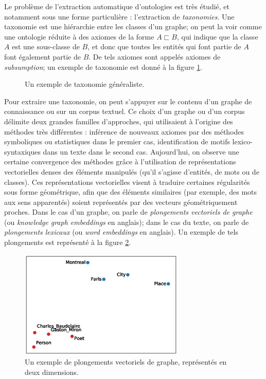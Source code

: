 Le problème de l'extraction automatique d'ontologies est très étudié, et notamment sous une forme particulière : l'extraction de \textit{taxonomies}. Une taxonomie est une hiérarchie entre les classes d'un graphe; on peut la voir comme une ontologie réduite à des axiomes de la forme $A \sqsubset B$, qui indique que la classe $A$ est une sous-classe de $B$, et donc que toutes les entités qui font partie de $A$ font également partie de $B$. De tels axiomes sont appelés axiomes de \textit{subsumption}; un exemple de taxonomie est donné à la figure \ref{fig:intro-taxo}.

\begin{figure}[h]
    \centering
    
    \caption{Un exemple de taxonomie généraliste.}
    \label{fig:intro-taxo}
\end{figure}


Pour extraire une taxonomie, on peut s'appuyer sur le contenu d'un graphe de connaissance ou sur un corpus textuel. Ce choix d'un graphe ou d'un corpus délimite deux grandes familles d'approches, qui utilisaient à l'origine des méthodes très différentes :
inférence de nouveaux axiomes par des méthodes symboliques ou statistiques dans le premier cas,  identification de motifs lexico-syntaxiques dans un texte dans le second cas. Aujourd'hui, 
on observe une certaine convergence des méthodes grâce à l'utilisation de représentations vectorielles denses des éléments manipulés (qu'il s'agisse d'entités, de mots ou de classes). Ces représentations vectorielles visent à traduire certaines régularités sous forme géométrique, afin que des éléments similaires (par exemple, des mots aux sens apparentés) soient représentés par des vecteurs géométriquement proches. Dans le cas d'un graphe, on parle de \textit{plongements vectoriels de graphe} (ou \textit{knowledge graph embeddings} en anglais); dans le cas du texte, on parle de \textit{plongements lexicaux} (ou \textit{word embeddings} en anglais). Un exemple de tels plongements est représenté à la figure \ref{fig:intro-embeddings}.

%

\begin{figure}[h]
    \centering
    \includegraphics[width=0.7\textwidth]{img/embedding_pca_transe2.eps}
    \caption[Exemple de plongements vectoriels]{
    Un exemple de plongements vectoriels de graphe, représentés en deux dimensions\footnotemark.}
    \label{fig:intro-embeddings}
\end{figure}


